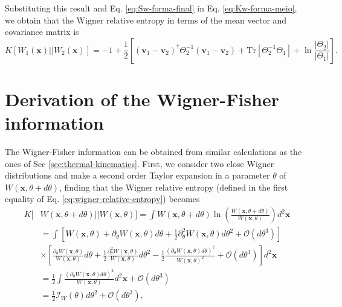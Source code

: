 \begin{apendicesenv}
\noindent Substituting this result and Eq. \eqref{eq:Sw-forma-final} in Eq. \eqref{eq:Kw-forma-meio}, we obtain that the Wigner relative entropy in terms of the mean vector and covariance matrix is
\begin{equation}
    K[W_1(\mathbf{x}) || W_2(\mathbf{x})] = -1 + \frac{1}{2} \left [(\mathbf{v}_1 - \mathbf{v}_2)^\dagger \Theta^{-1}_2  (\mathbf{v}_1 - \mathbf{v}_2) + \text{Tr}[ \Theta^{-1}_2 \Theta_1] + \ln \frac{|\Theta_2|}{|\Theta_1|} \right].
\end{equation}





\chapter{Derivation of the Wigner-Fisher information}
\label{apx:WFI}

The Wigner-Fisher information can be obtained from similar calculations as the ones of Sec \ref{sec:thermal-kinematics}. First, we consider two close Wigner distributions and make a second order Taylor expansion in a parameter $\theta$ of $W(\mathbf{x}, \theta+d\theta)$, finding that the Wigner relative entropy (defined in the first equality of Eq. \eqref{eq:wigner-relative-entropy}) becomes
\begin{equation}
    \begin{split}
        K[&W(\mathbf{x}, \theta+d\theta) || W(\mathbf{x}, \theta)] = \int W(\mathbf{x}, \theta+d\theta) \ln \left ( \frac{W(\mathbf{x}, \theta+d\theta)}{W(\mathbf{x}, \theta)} \right ) d^2 \mathbf{x} \\
        &= \int [W(\mathbf{x}, \theta) + \partial_\theta W(\mathbf{x}, \theta) d\theta + \frac{1}{2} \partial_\theta^2 W(\mathbf{x}, \theta) d\theta^2 + \mathcal{O}(d\theta^3)]\\
        &\times \left[\frac{\partial_\theta W(\mathbf{x}, \theta)}{W(\mathbf{x}, \theta)} d\theta + \frac{1}{2}\frac{\partial_\theta^2 W(\mathbf{x}, \theta)}{W(\mathbf{x}, \theta)} d\theta^2 - \frac{1}{2} \frac{(\partial_\theta W(\mathbf{x}, \theta)d\theta)^2}{W(\mathbf{x}, \theta)^2} + \mathcal{O}(d\theta^3) \right] d^2 \mathbf{x} \\
        &= \frac{1}{2}\int \frac{(\partial_\theta W(\mathbf{x}, \theta) d\theta)^2}{W(\mathbf{x}, \theta)} d^2 \mathbf{x} + \mathcal{O}(d\theta^3)\\
        &= \frac{1}{2} \mathcal{I}_W(\theta) d\theta^2 + \mathcal{O}(d\theta^3),
    \end{split}
\end{equation}


\end{apendicesenv}
